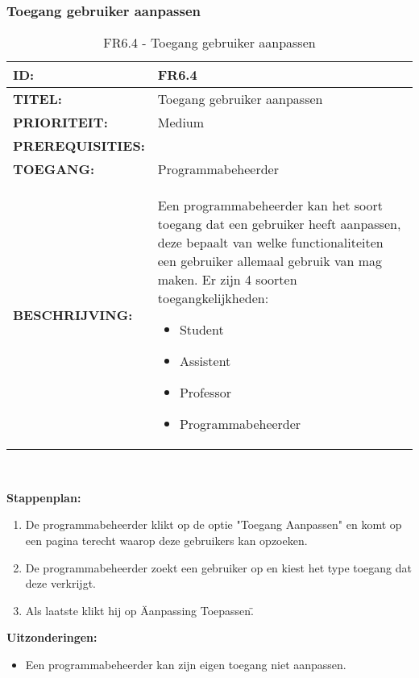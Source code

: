 \subsubsection{Toegang gebruiker aanpassen }
\noindent\begin{table}[H]
            \begin{tabular}{l | p{10cm}}
                \textbf{ID:} & FR6.4 \\ \hline
                \textbf{TITEL:} & Toegang gebruiker aanpassen \\ \hline
                \textbf{PRIORITEIT:} &  Medium \\ \hline
                \textbf{PREREQUISITIES:} & \\ \hline
                \textbf{TOEGANG:} & Programmabeheerder \\ \hline
                \textbf{BESCHRIJVING:} & Een programmabeheerder kan het soort toegang dat een gebruiker heeft aanpassen, deze bepaalt van welke functionaliteiten een gebruiker allemaal gebruik van mag maken. Er zijn 4 soorten toegangkelijkheden: 
                \begin{itemize}
                		\item Student
                		\item Assistent
                		\item Professor
                		\item Programmabeheerder
                \end{itemize}
            \end{tabular}\\
            \caption{FR6.4 - Toegang gebruiker aanpassen }
            \label{tab:FR6.4 - Toegang gebruiker aanpassen }
        \end{table}   

\textbf{Stappenplan:}
	\begin{enumerate}
	\item De programmabeheerder klikt op de optie "Toegang Aanpassen" en komt op een pagina terecht waarop deze gebruikers kan opzoeken.
	\item De programmabeheerder zoekt een gebruiker op en kiest het type toegang dat deze verkrijgt.
	\item Als laatste klikt hij op \"Aanpassing Toepassen\".
	\end{enumerate}	
	
\textbf{Uitzonderingen:}
\begin{itemize}
\item Een programmabeheerder kan zijn eigen toegang niet aanpassen.
\end{itemize}

\clearpage